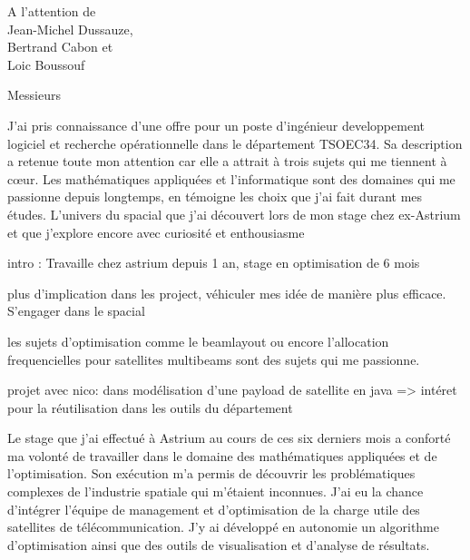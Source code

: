 \documentclass[12pt]{lettre}
\begin{document}
\begin{letter}{A l'attention de\\Jean-Michel Dussauze,\\Bertrand Cabon et\\ Loic Boussouf}
\address{Victor Cameo Ponz\\47 rue Guynemer\\31200 Toulouse}
\nofax

\opening{Messieurs}
J'ai pris connaissance d'une offre pour un poste d'ingénieur developpement logiciel et recherche opérationnelle dans le département TSOEC34.
Sa description a retenue toute mon attention car elle a attrait à trois sujets qui me tiennent à c\oe{}ur.
Les mathématiques appliquées et l'informatique sont des domaines qui me passionne depuis longtemps, en témoigne les choix que j'ai fait durant mes études.
L'univers du spacial que j'ai découvert lors de mon stage chez ex-Astrium et que j'explore encore avec curiosité et enthousiasme



intro : Travaille chez astrium depuis 1 an, stage en optimisation de 6 mois

plus d'implication dans les project, véhiculer mes idée de manière plus efficace. S'engager dans le spacial

les sujets d'optimisation comme le beamlayout ou encore l'allocation frequencielles pour satellites multibeams sont des sujets qui me passionne.

projet avec nico: dans modélisation d'une payload de satellite en java => intéret pour la réutilisation dans les outils du département

Le stage que j'ai effectué à Astrium au cours de ces six derniers mois a conforté ma volonté de travailler dans le domaine des mathématiques appliquées et de l'optimisation. Son exécution m'a permis de découvrir les problématiques complexes de l'industrie spatiale qui m'étaient inconnues. J'ai eu la chance d'intégrer l'équipe de management et d'optimisation de la charge utile des satellites de télécommunication. J'y ai développé en autonomie un algorithme d'optimisation ainsi que des outils de visualisation et d'analyse de résultats.


\end{letter}
\end{document}
